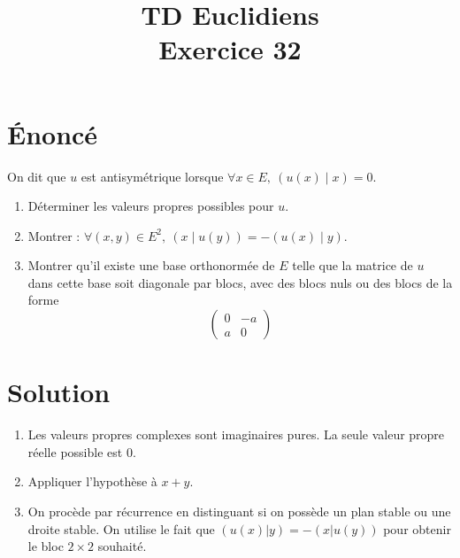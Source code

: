 \documentclass[french]{article}
\title{TD Euclidiens\\ Exercice 32}
\date{}
\begin{document}
\maketitle

\section{Énoncé}
On dit que $u$ est antisymétrique lorsque $\forall x\in E,\ (u(x)\mid x)=0$.
\begin{enumerate}
	\item Déterminer les valeurs propres possibles pour $u$.
	\item Montrer : $\forall (x,y)\in E^2,\ (x\mid u(y))=-(u(x)\mid y)$.
	\item Montrer qu'il existe une base orthonormée de $E$ telle que la matrice de $u$ dans cette base soit diagonale par blocs, avec des blocs nuls ou des blocs de la forme $$\begin{pmatrix}
		0&-a\\
		a&0
	\end{pmatrix}$$
\end{enumerate}
\section{Solution}
\begin{enumerate}
	\item Les valeurs propres complexes sont imaginaires pures. La seule valeur propre réelle possible est $0$.
	\item Appliquer l'hypothèse à $x+y$.
	\item On procède par récurrence en distinguant si on possède un plan stable ou une droite stable. On utilise le fait que $(u(x)|y)=-(x|u(y))$ pour obtenir le bloc $2\times 2$ souhaité.
\end{enumerate}
\end{document}
